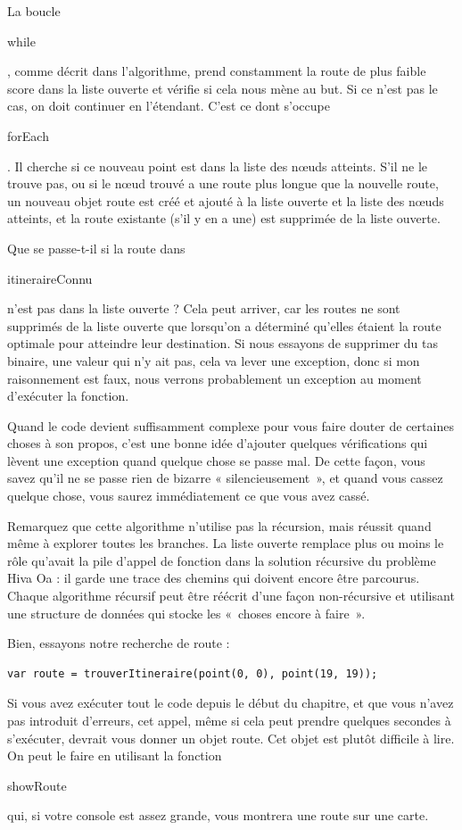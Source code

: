 \documentclass{FramateX}
\renewcommand{\texttt}[1]{\begin{sffamily}{#1}\end{sffamily}}
\begin{document}
La boucle \texttt{while}, comme décrit dans l'algorithme, prend
constamment la route de plus faible score dans la liste ouverte et
vérifie si cela nous mène au but. Si ce n'est pas le cas, on doit
continuer en l'étendant. C'est ce dont s'occupe \texttt{forEach}. Il
cherche si ce nouveau point est dans la liste des nœuds atteints. S'il
ne le trouve pas, ou si le nœud trouvé a une route plus longue que la
nouvelle route, un nouveau objet route est créé et ajouté à la liste
ouverte et la liste des nœuds atteints, et la route existante (s'il y en
a une) est supprimée de la liste ouverte.

Que se passe-t-il si la route dans \texttt{itineraireConnu} n'est pas
dans la liste ouverte ? Cela peut arriver, car les routes ne sont
supprimés de la liste ouverte que lorsqu'on a déterminé qu'elles étaient
la route optimale pour atteindre leur destination. Si nous essayons de
supprimer du tas binaire, une valeur qui n'y ait pas, cela va lever une
exception, donc si mon raisonnement est faux, nous verrons probablement
un exception au moment d'exécuter la fonction.

Quand le code devient suffisamment complexe pour vous faire douter de
certaines choses à son propos, c'est une bonne idée d'ajouter quelques
vérifications qui lèvent une exception quand quelque chose se passe mal.
De cette façon, vous savez qu'il ne se passe rien de bizarre «
silencieusement~», et quand vous cassez quelque chose, vous saurez
immédiatement ce que vous avez cassé.

\begin{center}\end{center}

Remarquez que cette algorithme n'utilise pas la récursion, mais réussit
quand même à explorer toutes les branches. La liste ouverte remplace
plus ou moins le rôle qu'avait la pile d'appel de fonction dans la
solution récursive du problème Hiva Oa : il garde une trace des chemins
qui doivent encore être parcourus. Chaque algorithme récursif peut être
réécrit d'une façon non-récursive et utilisant une structure de données
qui stocke les «~choses encore à faire~».

\begin{center}\end{center}

Bien, essayons notre recherche de route :

\begin{lstlisting}
var route = trouverItineraire(point(0, 0), point(19, 19));
\end{lstlisting}
Si vous avez exécuter tout le code depuis le début du chapitre, et que
vous n'avez pas introduit d'erreurs, cet appel, même si cela peut
prendre quelques secondes à s'exécuter, devrait vous donner un objet
route. Cet objet est plutôt difficile à lire. On peut le faire en
utilisant la fonction \texttt{showRoute} qui, si votre console est assez
grande, vous montrera une route sur une carte.
\end{document}
